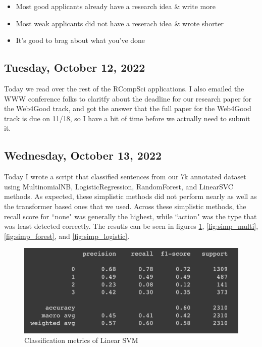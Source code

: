 \documentclass[11pt,letterpaper]{article}
\begin{document}
\begin{itemize}
    \item Most good applicants already have a research idea \& write more
    \item Most weak applicants did not have a reserach idea \& wrote shorter
    \item It's good to brag about what you've done
\end{itemize}

\subsection{Tuesday, October 12, 2022}
Today we read over the rest of the RCompSci applications. I also emailed the WWW conference folks to claritfy about the deadline for our research paper for the Web4Good track, and got the answer that the full paper for the Web4Good track is due on 11/18, so I have a bit of time before we actually need to submit it.

\subsection{Wednesday, October 13, 2022}
Today I wrote a script that classified sentences from our 7k annotated dataset using MultinomialNB, LogisticRegression, RandomForest, and LinearSVC methods. As expected, these simplistic methods did not perform nearly as well as the transformer based ones that we used. Across these simplistic methods, the recall score for ``none" was generally the highest, while ``action" was the type that was least detected correctly. The resutls can be seen in figures \ref{fig:simp_linear}, \ref{fig:simp_multi}, \ref{fig:simp_forest}, and \ref{fig:simp_logistic}.

\begin{figure}
    \centering
    \includegraphics[scale=0.6]{images/simp_linear.png}
    \caption{Classification metrics of Linear SVM}
    \label{fig:simp_linear}
\end{figure}
\end{document}
